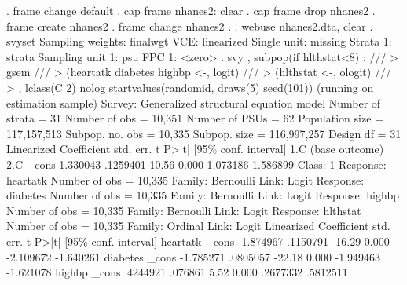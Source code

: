 . frame change default
{\smallskip}
. cap frame nhanes2: clear
{\smallskip}
. cap frame drop nhanes2
{\smallskip}
. frame create nhanes2
{\smallskip}
. frame change nhanes2
{\smallskip}
. 
. webuse nhanes2.dta, clear
{\smallskip}
. svyset
{\smallskip}
Sampling weights: finalwgt
             VCE: linearized
     Single unit: missing
        Strata 1: strata
 Sampling unit 1: psu
           FPC 1: <zero>
{\smallskip}
. svy , subpop(if hlthstat<8) : ///
>         gsem ///
>                 (heartatk diabetes highbp <-, logit) ///
>                 (hlthstat <-, ologit) /// 
>         , lclass(C 2) nolog  startvalues(randomid, draws(5) seed(101)) 
(running {} on estimation sample)
{\smallskip}
Survey: Generalized structural equation model
{\smallskip}
Number of strata = 31                            Number of obs   =      10,351
Number of PSUs   = 62                            Population size = 117,157,513
                                                 Subpop. no. obs =      10,335
                                                 Subpop. size    = 116,997,257
                                                 Design df       =          31
{\smallskip}
             {\VBAR}             Linearized
             {\VBAR} Coefficient  std. err.      t    P>|t|     [95\% conf. interval]
1.C          {\VBAR}  (base outcome)
2.C          {\VBAR}
       _cons {\VBAR}   1.330043   .1259401    10.56   0.000     1.073186    1.586899
{\smallskip}
Class:    1        
{\smallskip}
Response: heartatk                                      Number of obs = 10,335
Family:   Bernoulli
Link:     Logit    
{\smallskip}
Response: diabetes                                      Number of obs = 10,335
Family:   Bernoulli
Link:     Logit    
{\smallskip}
Response: highbp                                        Number of obs = 10,335
Family:   Bernoulli
Link:     Logit    
{\smallskip}
Response: hlthstat                                      Number of obs = 10,335
Family:   Ordinal  
Link:     Logit    
{\smallskip}
             {\VBAR}             Linearized
             {\VBAR} Coefficient  std. err.      t    P>|t|     [95\% conf. interval]
heartatk     {\VBAR}
       _cons {\VBAR}  -1.874967   .1150791   -16.29   0.000    -2.109672   -1.640261
diabetes     {\VBAR}
       _cons {\VBAR}  -1.785271   .0805057   -22.18   0.000    -1.949463   -1.621078
highbp       {\VBAR}
       _cons {\VBAR}   .4244921    .076861     5.52   0.000     .2677332    .5812511
